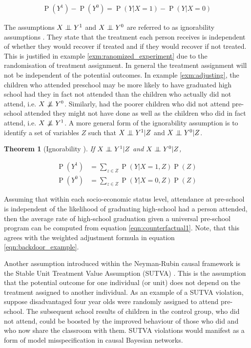 \documentclass[11pt,a4paper,twoside]{report}
\newcommand{\eqn}[1]{\begin{align}#1\end{align}}
\newcommand{\eq}[1]{\begin{align*}#1\end{align*}}
\renewcommand{\P}[1]{\operatorname{P}\left(#1\right)}
\newcommand{\cf}[2]{{#1}^{#2}}
\theoremstyle{plain}
\newtheorem{theorem}{Theorem}
\theoremstyle{definition}
\newcommand{\ci}{\mathrel{\perp\mspace{-10mu}\perp}}
\newcommand{\nci}{\centernot{\ci}}
\begin{document}
\eq{
\P{Y^{1}}-\P{Y^{0}} = \P{Y|X=1} - \P{Y|X=0}
}

The assumptions $X \ci Y^{1}$ and $X \ci Y^{0}$  are referred to as ignorability assumptions \citep{Rosenbaum1983}. They state that the treatment each person receives is independent of whether they would recover if treated and if they would recover if not treated. This is justified in example \ref{exm:ranomized_experiment} due to the randomisation of treatment assignment. In general the treatment assignment will not be independent of the potential outcomes. In example \ref{exm:adjusting}, the children who attended preschool may be more likely to have graduated high school had they in fact not attended than the children who actually did not attend, i.e. $X \nci \cf{Y}{0}$. Similarly, had the poorer children who did not attend pre-school attended they might not have done as well as the children who did in fact attend, i.e. $X \nci \cf{Y}{1}$. A more general form of the ignorability assumption is to identify a set of variables $Z$ such that $X \ci Y^{1}|Z$ and $X \ci Y^{0}|Z$. 

\vspace*{.3cm}
\begin{theorem}[Ignorability \citep{Rosenbaum1983, Pearl2000}] If $X \ci Y^{1}|Z$ and $X \ci Y^{0}|Z$,

\eqn{
\label{eqn:counterfactual1}
\P{\cf{Y}{1}} &= \sum_{z \in Z}\P{Y|X=1,Z}\P{Z}  \\
\label{eqn:counterfactual2}
\P{\cf{Y}{0}} &= \sum_{z \in Z}\P{Y|X=0,Z}\P{Z}
}
\end{theorem}

Assuming that within each socio-economic status level, attendance at pre-school is independent of the likelihood of graduating high-school had a person attended, then the average rate of high-school graduation given a universal pre-school program can be computed from equation \ref{eqn:counterfactual1}. Note, that this agrees with the weighted adjustment formula in equation \ref{eqn:backdoor_example}. 

Another assumption introduced within the Neyman-Rubin causal framework is the Stable Unit Treatment Value Assumption (SUTVA) \citep{Rubin1978}. This is the assumption that the potential outcome for one individual (or unit) does not depend on the treatment assigned to another individual. As an example of a SUTVA violation, suppose disadvantaged four year olds were randomly assigned to attend pre-school. The subsequent school results of children in the control group, who did not attend, could be boosted by the improved behaviour of those who did and who now share the classroom with them. SUTVA violations would manifest as a form of model misspecification in causal Bayesian networks. 
\end{document}
